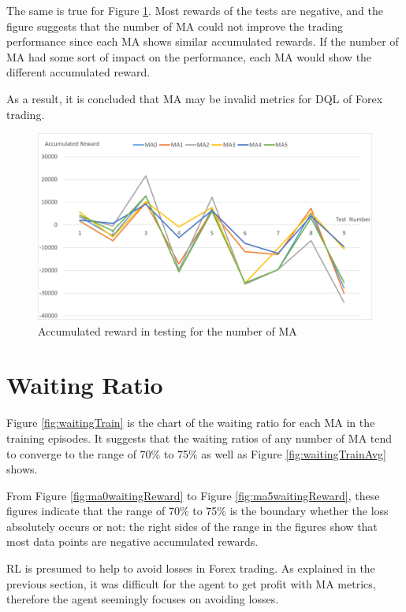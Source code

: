 The same is true for Figure \ref{fig:acRewardTest}. Most rewards of the tests are negative, and the figure suggests that the number of MA could not improve the trading performance since each MA shows similar accumulated rewards. If the number of MA had some sort of impact on the performance, each MA would show the different accumulated reward.

As a result, it is concluded that MA may be invalid metrics for DQL of Forex trading.
\begin{figure}[htbp]
  \centering
  \includegraphics[scale=0.5]{./Figure/acRewardTest.png}
  \caption{Accumulated reward in testing for the number of MA}
  \label{fig:acRewardTest}
\end{figure}


\section{Waiting Ratio}
\label{sec:waitingRatioResult}
Figure \ref{fig:waitingTrain} is the chart of the waiting ratio for each MA in the training episodes. It suggests that the waiting ratios of any number of MA tend to converge to the range of 70\% to 75\% as well as Figure \ref{fig:waitingTrainAvg} shows. 

From Figure \ref{fig:ma0waitingReward} to Figure \ref{fig:ma5waitingReward}, these figures indicate that the range of 70\% to 75\% is the boundary whether the loss absolutely occurs or not: the right sides of the range in the figures show that most data points are negative accumulated rewards.

RL is presumed to help to avoid losses in Forex trading. As explained in the previous section, it was difficult for the agent to get profit with MA metrics, therefore the agent seemingly focuses on avoiding losses. 

